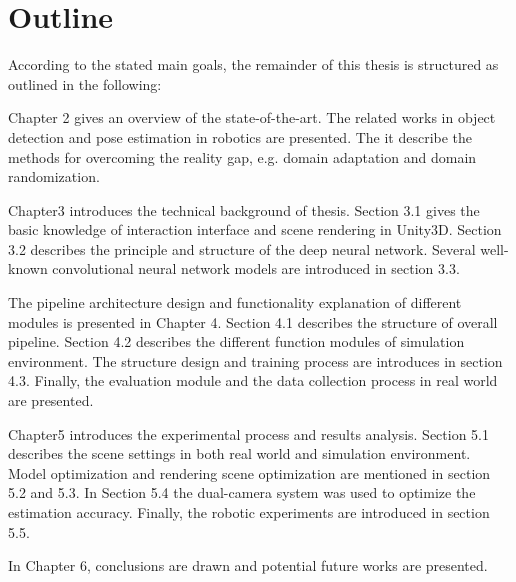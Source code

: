 \section{Outline}
According to the stated main goals, the remainder of this thesis is structured as outlined in the following:

Chapter 2 gives an overview of the state-of-the-art. The related works in object detection and pose estimation in robotics are presented. The it describe the methods for overcoming  the reality gap, e.g. domain adaptation and domain randomization.

Chapter3 introduces the technical background of thesis. Section 3.1 gives the basic knowledge of interaction interface and scene rendering in Unity3D. Section 3.2 describes the principle and structure of the deep neural network. Several well-known convolutional neural network models are introduced in section 3.3.

The pipeline architecture design and functionality explanation of different modules is presented in Chapter 4. Section 4.1 describes the structure of overall pipeline. Section 4.2 describes the different function modules of simulation environment. The structure design and training process are introduces in section 4.3. Finally, the evaluation module and the data collection process in real world are presented.

Chapter5 introduces the experimental process and results analysis. Section 5.1 describes the scene settings in both real world and simulation environment. Model optimization and rendering scene optimization are mentioned in section 5.2 and 5.3. In Section 5.4 the dual-camera system was used to optimize the estimation accuracy. Finally, the robotic experiments are introduced in section 5.5.

In Chapter 6, conclusions are drawn and potential future works are presented.
